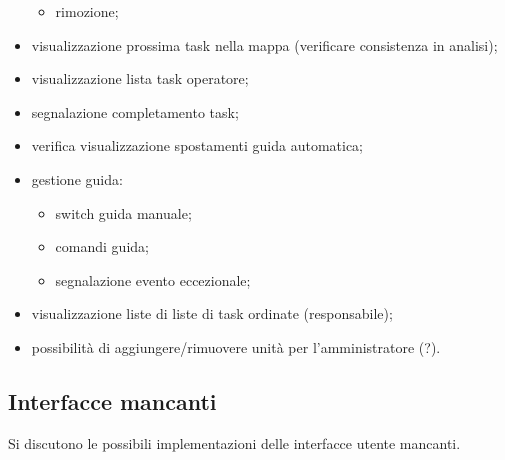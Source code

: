 \begin{itemize}
\begin{itemize}
            \item rimozione;
        \end{itemize}
        \item visualizzazione prossima task nella mappa (verificare consistenza in analisi);
        \item visualizzazione lista task operatore;
        \item segnalazione completamento task;
        \item verifica visualizzazione spostamenti guida automatica;
        \item gestione guida:
        \begin{itemize}
            \item switch guida manuale;
            \item comandi guida;
            \item segnalazione evento eccezionale;
        \end{itemize}
        \item visualizzazione liste di liste di task ordinate (responsabile);
        \item possibilità di aggiungere/rimuovere unità per l'amministratore (?).
    \end{itemize}



\subsection{Interfacce mancanti}
\label{ui}
    Si discutono le possibili implementazioni delle interfacce utente mancanti.
